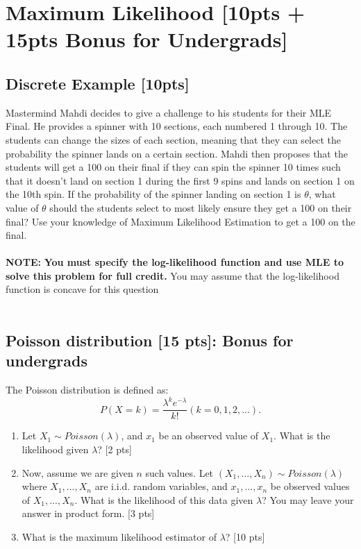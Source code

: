 \documentclass{article}
\begin{document}
\newpage
\section{Maximum Likelihood [10pts + 15pts Bonus for Undergrads]}
\subsection{Discrete Example [10pts]}
Mastermind Mahdi decides to give a challenge to his students for their MLE Final. He provides a spinner with 10 sections, each numbered 1 through 10. The students can change the sizes of each section, meaning that they can select the probability the spinner lands on a certain section. Mahdi then proposes that the students will get a 100 on their final if they can spin the spinner 10 times such that it doesn't land on section 1 during the first 9 spins and lands on section 1 on the 10th spin. If the probability of the spinner landing on section 1 is $\theta$, what value of $\theta$ should the students select to most likely ensure they get a 100 on their final? Use your knowledge of Maximum Likelihood Estimation to get a 100 on the final. \\\\\textbf{NOTE: } \textbf{You must specify the log-likelihood function and use MLE to solve this problem for full credit.} You may assume that the log-likelihood function is concave for this question \\\\

\subsection{Poisson distribution [15 pts]: Bonus for undergrads}
The Poisson distribution is defined as:
$$P(X=k)=\frac{\lambda^k e^{-\lambda}}{k!} (k=0,1,2,...).$$
\begin{enumerate}[label=(\alph*)]
    \item Let $X_1 \sim Poisson(\lambda)$, and $x_1$ be an observed value of $X_1$. What is the likelihood given $\lambda$? [2 pts]
    \item Now, assume we are given $n$ such values. Let $(X_1, ...,X_n)\sim Poisson(\lambda)$ where $X_1, ...,X_n$ are i.i.d. random variables, and $x_1,...,x_n$ be observed values of $X_1, ...,X_n$. What is the likelihood of this data given $\lambda$? You may leave your answer in product form. [3 pts]
    \item What is the maximum likelihood estimator of $\lambda$? [10 pts]
\end{enumerate}
\end{document}
